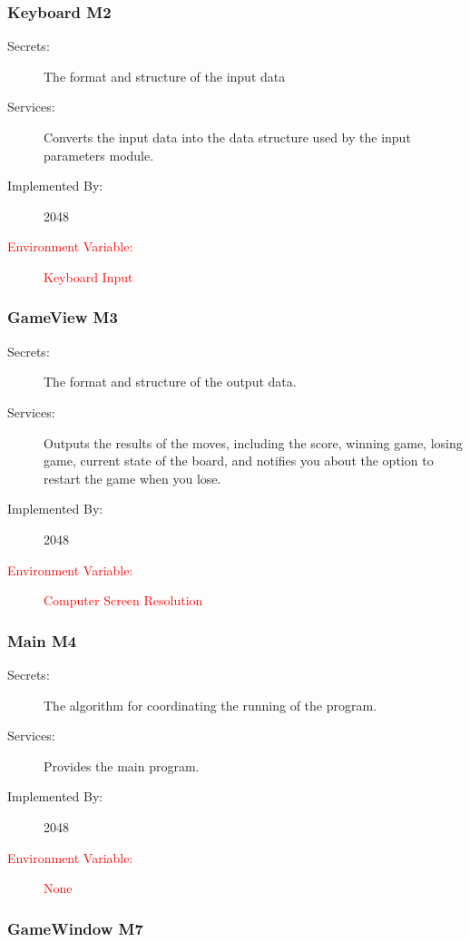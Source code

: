 \documentclass[12pt]{article}
\begin{document}
\subsubsection{Keyboard \textbf{M2}}

\begin{description}
\item[Secrets:]The format and structure of the input data
\item[Services:]Converts the input data into the data structure used by the
  input parameters module.
\item[Implemented By:] 2048
\item[\textcolor{red}{Environment Variable:} ]\textcolor{red}{Keyboard Input} 

\end{description}

\subsubsection{GameView \textbf{M3}}

\begin{description}
\item[Secrets:]The format and structure of the output data.
\item[Services:]Outputs the results of the moves, including the score, winning game, losing game, current state of the board, and notifies you about the option to restart the game when you lose. 
\item[Implemented By:] 2048
\item[\textcolor{red}{Environment Variable:} ]\textcolor{red}{Computer Screen Resolution} 
\end{description}

\subsubsection{Main \textbf{M4}}

\begin{description}
\item[Secrets:] The algorithm for coordinating the running of the program.
\item[Services:] Provides the main program.
\item[Implemented By:] 2048
\item[\textcolor{red}{Environment Variable:} ]\textcolor{red}{None} 
\end{description}

{\color{red}\subsubsection{GameWindow \textbf{M7}}}
\end{document}
